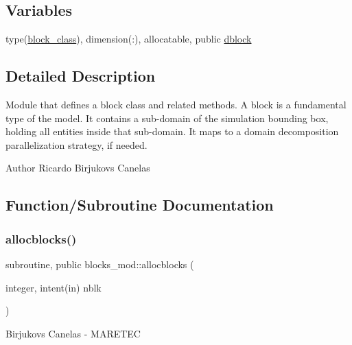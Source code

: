 \subsection*{Variables}
\begin{DoxyCompactItemize}
\item 
type(\hyperlink{structblocks__mod_1_1block__class}{block\+\_\+class}), dimension(\+:), allocatable, public \hyperlink{namespaceblocks__mod_ac8ad6e3cf7a812f95dadb592336aca50}{dblock}
\end{DoxyCompactItemize}


\subsection{Detailed Description}
Module that defines a block class and related methods. A block is a fundamental type of the model. It contains a sub-\/domain of the simulation bounding box, holding all entities inside that sub-\/domain. It maps to a domain decomposition parallelization strategy, if needed. 

\begin{DoxyAuthor}{Author}
Ricardo Birjukovs Canelas 
\end{DoxyAuthor}


\subsection{Function/\+Subroutine Documentation}
\mbox{\label{namespaceblocks__mod_a639beb0fee2290d46353f4b4702d6711}} 
\subsubsection{\texorpdfstring{allocblocks()}{allocblocks()}}
{\footnotesize\ttfamily subroutine, public blocks\+\_\+mod\+::allocblocks (\begin{DoxyParamCaption}\item[{integer, intent(in)}]{nblk }\end{DoxyParamCaption})}



Birjukovs Canelas -\/ M\+A\+R\+E\+T\+EC 

